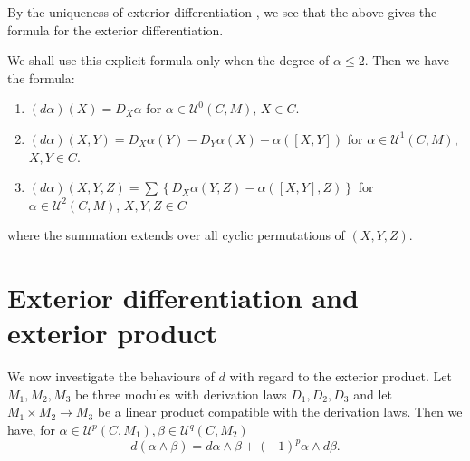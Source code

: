 By the uniqueness of exterior differentiation , we see that the above
 gives the formula for the exterior differentiation. 
  
 We shall use this explicit formula only when the degree of $\alpha
 \le 2$. Then we have the formula: 
\begin{enumerate}
\item $(d \alpha) (X) =  D_X \alpha$ for $\alpha \in \mathscr{U}^0
  (C,M)$, $X \in C$. 
\item $(d \alpha) (X,Y)  = D_X \alpha (Y)- D_Y \alpha (X) - \alpha
  ([X,Y])$ for $\alpha \in \mathscr{U}^1(C,M)$, $X, Y  \in C$.  
\item  $(d \alpha) (X,Y,Z)  = \sum \left\{ D_X \alpha (Y,Z)- \alpha
  ([X,Y],Z) \right\}$ for $\alpha \in \mathscr{U}^2(C,M)$, $X, Y, Z \in C$ 
\end{enumerate} 
where the summation  extends over all cyclic permutations of $(X,Y,Z)$.
 
\section{Exterior differentiation and exterior product}\label{chap1:sec8} %
 
We now investigate the behaviours  of $d$ with regard to the exterior
product. Let $M_1, M_2, M_3$ be three modules with derivation laws
$D_1, D_2, D_3$ and let $M_1 \times M_2 \to M_3$ be a linear product
compatible with the derivation laws. Then we have, for $\alpha \in
\mathscr{U}^p (C,M_1), \beta \in \mathscr{U}^q (C,M_2)$ 
$$
d(\alpha \wedge \beta) = d \alpha \wedge \beta +(-1)^p \alpha \wedge d
\beta.  
$$
 
